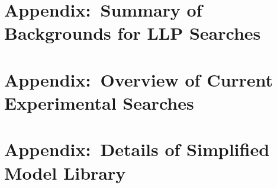 \documentclass[a4paper,debug,notitlepage,nobib]{tufte-book}
\begin{document}
\appendix




\chapter{Appendix:~Summary of Backgrounds for LLP Searches}
\label{sec:backgrounds}


\chapter{Appendix:~Overview of Current Experimental Searches}
\label{sec:experimental_searches}


\chapter{Appendix:~Details of Simplified Model Library}
\label{sec:library_more}


%

%

%
% 
%
%
%
%
%
\printbibliography
\end{document}
